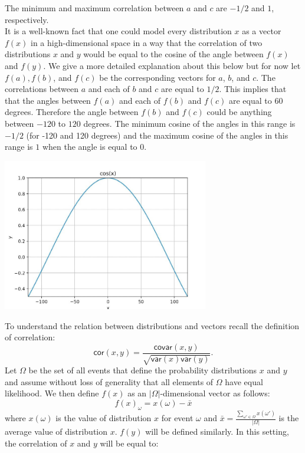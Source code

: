 \begin{solution}
The minimum and maximum correlation between $a$ and $c$ are $-1/2$ and $1$, respectively.\\[0.2cm]

It is a well-known fact that one could model every distribution $x$ as a vector $f(x)$ in a high-dimensional space in a way that the correlation of two distributions $x$ and $y$ would be equal to the cosine of the angle between $f(x)$ and $f(y)$. We give a more detailed explanation about this below but for now let $f(a), f(b)$, and $f(c)$ be the corresponding vectors for $a$, $b$, and $c$. The correlations between $a$ and each of $b$ and $c$ are equal to $1/2$. This implies that that the angles between $f(a)$ and each of $f(b)$ and $f(c)$ are equal to 60 degrees. Therefore the angle between $f(b)$ and $f(c)$ could be anything between $-120$ to $120$ degrees. The minimum cosine of the angles in this range is $-1/2$ (for -120 and 120 degrees) and the maximum cosine of the angles in this range is $1$ when the angle is equal to 0.

\begin{center}
	\includegraphics[width=9cm]{81/figs/81_sol.png}
\end{center}

To understand the relation between distributions and vectors recall the definition of correlation: $$\textsf{cor}(x,y) = \frac{\mathsf{covar}(x,y)}{\sqrt{\mathsf{var}(x)\mathsf{var}(y)}}.$$
Let $\Omega$ be the set of all events that define the probability distributions $x$ and $y$ and assume without loss of generality that all elements of $\Omega$ have equal likelihood. We then define $f(x)$ as an $|\Omega|$-dimensional vector as follows:
$$f(x)_{\omega} = x(\omega) - \bar{x}$$ where $x(\omega)$ is the value of distribution $x$ for event $\omega$ and $\bar{x} = \frac{\sum_{\omega' \in \Omega} x(\omega')}{|\Omega|}$ is the average value of distribution $x$. $f(y)$ will be defined similarly. In this setting, the correlation of $x$ and $y$ will be equal to:


\end{solution}
